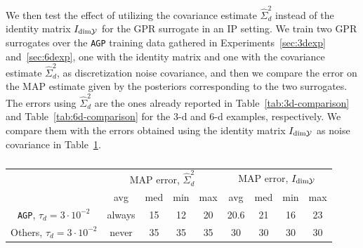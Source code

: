 We then test the effect of utilizing the covariance estimate $\hat \Sigma_d^2$ instead of the identity matrix $I_{\text{dim} \mathcal Y}$ for the GPR surrogate in an IP setting.
We train two GPR surrogates over the \texttt{AGP} training data gathered in Experiments~\ref{sec:3dexp} and~\ref{sec:6dexp}, one with the identity matrix and one with the covariance estimate $\hat \Sigma_d^2$, as discretization noise covariance, and then we compare the error on the MAP estimate given by the posteriors corresponding to the two surrogates.
The errors using $\hat \Sigma_d^2$ are the ones already reported in Table~\ref{tab:3d-comparison} and Table~\ref{tab:6d-comparison} for the 3-d and 6-d examples, respectively.
We compare them with the errors obtained using the identity matrix $I_{\text{dim} \mathcal Y } $ as noise covariance in Table~\ref{tab:cov_est_map}.

\begin{table}[H]
    \begin{centering}
        
    
    \begin{tabular}{ccccccccc}
    \toprule
        & \multicolumn{4}{c}{MAP error, $\hat \Sigma_d^2$} & \multicolumn{4}{c}{MAP error, $I_{\text{dim} \mathcal Y }$} \\ 
        & avg   & med   & min   & max   & avg   & med   & min   & max \\
        \midrule
        \texttt{AGP}, $\tau_d = 3 \cdot 10 ^{-2}$    
        &always  &  15   &  12   &  20   &  20.6 &  21   &   16  & 23   \\
        Others, $\tau_d = 3 \cdot 10 ^{-2}$    
        & never   &  35   &  35   &   35  &   30  &  30   &   30  & 30   \\
    \bottomrule
    \end{tabular}
    \caption{}
    \label{tab:cov_est_map}
\end{centering}
\end{table}
